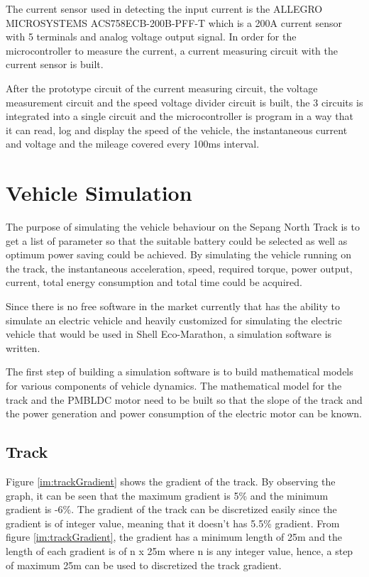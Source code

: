 The current sensor used in detecting the input current is the ALLEGRO MICROSYSTEMS ACS758ECB-200B-PFF-T which is a 200A current sensor with 5 terminals and analog voltage output signal. In order for the microcontroller to measure the current, a current measuring circuit with the current sensor is built.

After the prototype circuit of the current measuring circuit, the voltage measurement circuit and the speed voltage divider circuit is built, the 3 circuits is integrated into a single circuit and the microcontroller is program in a way that it can read, log and display the speed of the vehicle, the instantaneous current and voltage and the mileage covered every 100ms interval.

\section{Vehicle Simulation}
The purpose of simulating the vehicle behaviour on the Sepang North Track is to get a list of parameter so that the suitable battery could be selected as well as optimum power saving could be achieved. By simulating the vehicle running on the track, the instantaneous acceleration, speed, required torque, power output, current, total energy consumption and total time could be acquired.

Since there is no free software in the market currently that has the ability to simulate an electric vehicle and heavily customized for simulating the electric vehicle that would be used in Shell Eco-Marathon, a simulation software is written. 

The first step of building a simulation software is to build mathematical models for various components of vehicle dynamics. The mathematical model for the track and the PMBLDC motor need to be built so that the slope of the track and the power generation and power consumption of the electric motor can be known.

\subsection{Track}
Figure \ref{im:trackGradient} shows the gradient of the track. By observing the graph, it can be seen that the maximum gradient is 5\% and the minimum gradient is -6\%. The gradient of the track can be discretized easily since the gradient is of integer value, meaning that it doesn't has 5.5\% gradient. From figure \ref{im:trackGradient}, the gradient has a minimum length of 25m and the length of each gradient is of n x 25m where n is any integer value, hence, a step of maximum 25m can be used to discretized the track gradient.

